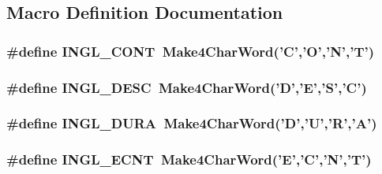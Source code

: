 \subsection{Macro Definition Documentation}
\hypertarget{a00216_a78aca8088eedbf34009fda36783648c1}{
\subsubsection[{I\-N\-G\-L\-\_\-\-C\-O\-N\-T}]{\setlength{\rightskip}{0pt plus 5cm}\#define I\-N\-G\-L\-\_\-\-C\-O\-N\-T~{\bf Make4\-Char\-Word}('C','O','N','T')}}\label{a00216_a78aca8088eedbf34009fda36783648c1}
\hypertarget{a00216_a35ba380487bfb1855ca063c1049e3f57}{
\subsubsection[{I\-N\-G\-L\-\_\-\-D\-E\-S\-C}]{\setlength{\rightskip}{0pt plus 5cm}\#define I\-N\-G\-L\-\_\-\-D\-E\-S\-C~{\bf Make4\-Char\-Word}('D','E','S','C')}}\label{a00216_a35ba380487bfb1855ca063c1049e3f57}
\hypertarget{a00216_aa353c4edca51904ff83b4f1b2b406dfb}{
\subsubsection[{I\-N\-G\-L\-\_\-\-D\-U\-R\-A}]{\setlength{\rightskip}{0pt plus 5cm}\#define I\-N\-G\-L\-\_\-\-D\-U\-R\-A~{\bf Make4\-Char\-Word}('D','U','R','A')}}\label{a00216_aa353c4edca51904ff83b4f1b2b406dfb}
\hypertarget{a00216_a34c9d1133a16119c1d4521d61600996e}{
\subsubsection[{I\-N\-G\-L\-\_\-\-E\-C\-N\-T}]{\setlength{\rightskip}{0pt plus 5cm}\#define I\-N\-G\-L\-\_\-\-E\-C\-N\-T~{\bf Make4\-Char\-Word}('E','C','N','T')}}\label{a00216_a34c9d1133a16119c1d4521d61600996e}
